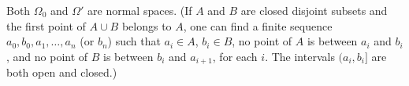 Both $\Omega_0$ and $\Omega'$ are normal spaces. (If $A$ and $B$ are closed disjoint subsets and the first point of $A \cup B$ belongs to $A$, one can find a finite sequence $a_0, b_0, a_1, \dots, a_n$ (or $b_n$) such that $a_i \in A$, $b_i \in B$, no point of $A$ is between $a_i$ and $b_i$, and no point of $B$ is between $b_i$ and $a_{i+1}$, for each $i$. The intervals $(a_i, b_i]$ are both open and closed.)
